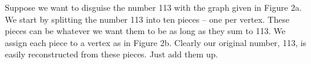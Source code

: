 \documentclass[12pt]{article}
\begin{document}
\noindent Suppose we want to disguise the number 113 with the graph given in Figure 2a. We start by splitting the number 113 into ten pieces -- one per vertex. These pieces can be whatever we want them to be as long as they sum to 113. We assign each piece to a vertex as in Figure 2b. Clearly our original number, 113, is easily reconstructed from these pieces. Just add them up.

\begin{figure}
    \centering
    \qquad
    \\

\end{figure}
\end{document}
